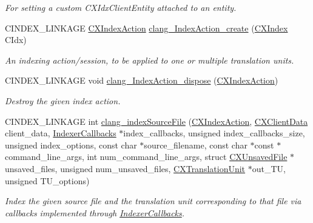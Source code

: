 \begin{DoxyCompactItemize}
\begin{DoxyCompactList}\small\item\em For setting a custom C\+X\+Idx\+Client\+Entity attached to an entity. \end{DoxyCompactList}\item 
C\+I\+N\+D\+E\+X\+\_\+\+L\+I\+N\+K\+A\+GE \hyperlink{group__CINDEX__HIGH_gac8d30d3e3fb34d887b611e7c6de3afb6}{C\+X\+Index\+Action} \hyperlink{group__CINDEX__HIGH_gaedee4ab7f093fedd27ed6995b1b7c62a}{clang\+\_\+\+Index\+Action\+\_\+create} (\hyperlink{group__CINDEX_gae039c2574bfd75774ca7a9a3e55910cb}{C\+X\+Index} C\+Idx)
\begin{DoxyCompactList}\small\item\em An indexing action/session, to be applied to one or multiple translation units. \end{DoxyCompactList}\item 
C\+I\+N\+D\+E\+X\+\_\+\+L\+I\+N\+K\+A\+GE void \hyperlink{group__CINDEX__HIGH_ga9b648aa6e87ea8d29dd0d4f0f592ffbb}{clang\+\_\+\+Index\+Action\+\_\+dispose} (\hyperlink{group__CINDEX__HIGH_gac8d30d3e3fb34d887b611e7c6de3afb6}{C\+X\+Index\+Action})
\begin{DoxyCompactList}\small\item\em Destroy the given index action. \end{DoxyCompactList}\item 
C\+I\+N\+D\+E\+X\+\_\+\+L\+I\+N\+K\+A\+GE int \hyperlink{group__CINDEX__HIGH_gaa5c2ad8979779c401b91110d444e2be6}{clang\+\_\+index\+Source\+File} (\hyperlink{group__CINDEX__HIGH_gac8d30d3e3fb34d887b611e7c6de3afb6}{C\+X\+Index\+Action}, \hyperlink{group__CINDEX_gacfa40c3de26d228c0d898403c2c21612}{C\+X\+Client\+Data} client\+\_\+data, \hyperlink{structIndexerCallbacks}{Indexer\+Callbacks} $\ast$index\+\_\+callbacks, unsigned index\+\_\+callbacks\+\_\+size, unsigned index\+\_\+options, const char $\ast$source\+\_\+filename, const char $\ast$const $\ast$command\+\_\+line\+\_\+args, int num\+\_\+command\+\_\+line\+\_\+args, struct \hyperlink{structCXUnsavedFile}{C\+X\+Unsaved\+File} $\ast$unsaved\+\_\+files, unsigned num\+\_\+unsaved\+\_\+files, \hyperlink{group__CINDEX_gacdb7815736ca709ce9a5e1ec2b7e16ac}{C\+X\+Translation\+Unit} $\ast$out\+\_\+\+TU, unsigned T\+U\+\_\+options)
\begin{DoxyCompactList}\small\item\em Index the given source file and the translation unit corresponding to that file via callbacks implemented through \hyperlink{structIndexerCallbacks}{Indexer\+Callbacks}. \end{DoxyCompactList}\item 

\end{DoxyCompactItemize}
